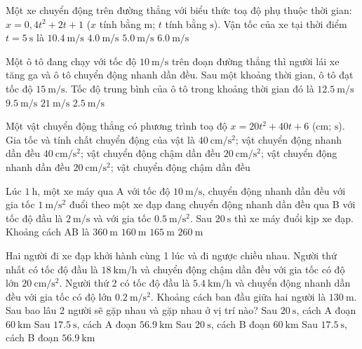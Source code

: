 \begin{ex}
Một xe chuyển động trên đường thẳng với biểu thức toạ độ phụ thuộc thời gian: $x=0,4t^2+2t+1$ ($x$ tính bằng $\si{\meter}$; $t$ tính bằng $\si{\second}$). Vận tốc của xe tại thời điểm $t=\SI{5}{\second}$ là
	\choice
	{$\SI{10.4}{\meter/\second}$}
	{$\SI{4.0}{\meter/\second}$}
	{$\SI{5.0}{\meter/\second}$}
	{\True $\SI{6.0}{\meter/\second}$}
	\loigiai{}
\end{ex}

\begin{ex}
Một ô tô đang chạy với tốc độ $\SI{10}{\meter/\second}$ trên đoạn đường thẳng thì người lái xe tăng ga và ô tô chuyển động nhanh dần đều. Sau một khoảng thời gian, ô tô đạt tốc độ $\SI{15}{\meter/\second}$. Tốc độ trung bình của ô tô trong khoảng thời gian đó là	
	\choice
	{\True $\SI{12.5}{\meter/\second}$}
	{$\SI{9.5}{\meter/\second}$}
	{$\SI{21}{\meter/\second}$}
	{$\SI{2.5}{\meter/\second}$}
	\loigiai{}
\end{ex}
\begin{ex}
	Một vật chuyển động thẳng có phương trình toạ độ $x=20t^2+40t+6$ ($\si{\centi\meter}$; $\si{\second}$). Gia tốc và tính chất chuyển động của vật là
	\choice
	{\True $\SI{40}{\centi\meter/\second^2}$; vật chuyển động nhanh dần đều}
	{$\SI{40}{\centi\meter/\second^2}$; vật chuyển động chậm dần đều}
	{$\SI{20}{\centi\meter/\second^2}$; vật chuyển động nhanh dần đều}
	{$\SI{20}{\centi\meter/\second^2}$; vật chuyển động chậm dần đều}
	\loigiai{}
\end{ex}
\begin{ex}
	Lúc $\SI{1}{\hour}$, một xe máy qua A với tốc độ $\SI{10}{\meter/\second}$, chuyển động nhanh dần đều với gia tốc $\SI{1}{\meter/\second^2}$ đuổi theo một xe đạp đang chuyển động nhanh dần đều qua B với tốc độ đầu là $\SI{2}{\meter/\second}$ và với gia tốc $\SI{0.5}{\meter/\second^2}$. Sau $\SI{20}{\second}$ thì xe máy đuổi kịp xe đạp. Khoảng cách AB là
	\choice
	{$\SI{360}{\meter}$}
	{$\SI{160}{\meter}$}
	{$\SI{165}{\meter}$}
	{\True $\SI{260}{\meter}$}
	\loigiai{}
\end{ex}
\begin{ex}
	Hai người đi xe đạp khởi hành cùng 1 lúc và đi ngược chiều nhau. Người thứ nhất có tốc độ đầu là $\SI{18}{\kilo\meter/\hour}$ và chuyển động chậm dần đều với gia tốc có độ lớn $\SI{20}{\centi\meter/\second^2}$. Người thứ 2 có tốc độ đầu là $\SI{5.4}{\kilo\meter/\hour}$ và chuyển động nhanh dần đều với gia tốc có độ lớn $\SI{0.2}{\meter/\second^2}$. Khoảng cách ban đầu giữa hai người là $\SI{130}{\meter}$. Sau bao lâu 2 người sẽ gặp nhau và gặp nhau ở vị trí nào?
	\choice
	{\True Sau $\SI{20}{\second}$, cách A đoạn $\SI{60}{\kilo\meter}$}
	{Sau $\SI{17.5}{\second}$, cách A đoạn $\SI{56.9}{\kilo\meter}$}
	{Sau $\SI{20}{\second}$, cách B đoạn $\SI{60}{\kilo\meter}$}
	{Sau $\SI{17.5}{\second}$, cách B đoạn $\SI{56.9}{\kilo\meter}$}
	\loigiai{}
\end{ex}
